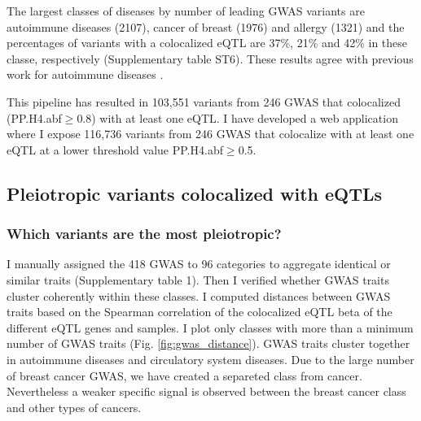 The largest classes of diseases by number of leading GWAS variants are autoimmune diseases (2107), cancer of breast (1976) and allergy (1321)
%
and the percentages of variants with a colocalized eQTL are 37\%, 21\% and 42\% in these classe, respectively (Supplementary table ST6).
%
%
These results agree with previous work for autoimmune diseases \citep{2021.Li.Mu}.

This pipeline has resulted in 103,551 variants from 246 GWAS that colocalized (PP.H4.abf$\geq$0.8) with at least one eQTL.
%
I have developed a web application where I expose 116,736 variants from 246 GWAS that colocalize with at least one eQTL at a lower threshold value PP.H4.abf$\geq$0.5.

\subsection*{Pleiotropic variants colocalized with eQTLs}

\subsubsection*{Which variants are the most pleiotropic?}

I manually assigned the 418 GWAS to 96 categories to aggregate identical or similar traits (Supplementary table 1).
%
Then I verified whether GWAS traits cluster coherently within these classes.
%
I computed distances between GWAS traits based on the Spearman correlation of the colocalized eQTL beta of the different eQTL genes and samples.
%
I plot only classes with more than a minimum number of GWAS traits (Fig. \ref{fig:gwas_distance}).
%
GWAS traits cluster together in autoimmune diseases and circulatory system diseases.
%
Due to the large number of breast cancer GWAS, we have created a separeted class from cancer.
Nevertheless a weaker specific signal is observed between the breast cancer class and other types of cancers.

